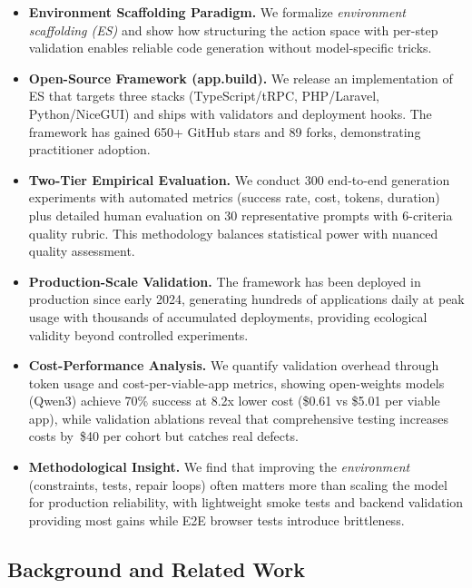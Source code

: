 \documentclass[conference]{IEEEtran}
\begin{document}
\begin{itemize}
  \item \textbf{Environment Scaffolding Paradigm.} We formalize \emph{environment scaffolding (ES)} and show how structuring the action space with per-step validation enables reliable code generation without model-specific tricks.
  \item \textbf{Open-Source Framework (app.build).} We release an implementation of ES that targets three stacks (TypeScript/tRPC, PHP/Laravel, Python/NiceGUI) and ships with validators and deployment hooks. The framework has gained 650+ GitHub stars and 89 forks, demonstrating practitioner adoption.
  \item \textbf{Two-Tier Empirical Evaluation.} We conduct 300 end-to-end generation experiments with automated metrics (success rate, cost, tokens, duration) plus detailed human evaluation on 30 representative prompts with 6-criteria quality rubric. This methodology balances statistical power with nuanced quality assessment.
  \item \textbf{Production-Scale Validation.} The framework has been deployed in production since early 2024, generating hundreds of applications daily at peak usage with thousands of accumulated deployments, providing ecological validity beyond controlled experiments.
  \item \textbf{Cost-Performance Analysis.} We quantify validation overhead through token usage and cost-per-viable-app metrics, showing open-weights models (Qwen3) achieve 70\% success at 8.2x lower cost (\$0.61 vs \$5.01 per viable app), while validation ablations reveal that comprehensive testing increases costs by~\$40 per cohort but catches real defects.
  \item \textbf{Methodological Insight.} We find that improving the \emph{environment} (constraints, tests, repair loops) often matters more than scaling the model for production reliability, with lightweight smoke tests and backend validation providing most gains while E2E browser tests introduce brittleness.
\end{itemize}


\subsection{Background and Related Work}
\end{document}
